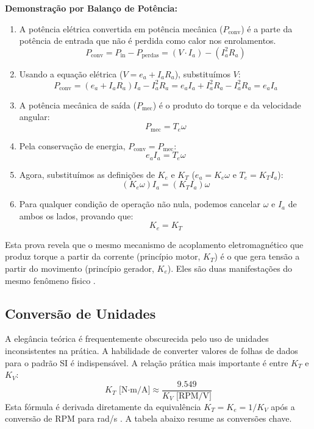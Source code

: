\documentclass[12pt, a4paper, openright, oneside, brazilian]{abntex2}
\begin{document}
\textbf{Demonstração por Balanço de Potência:}
\begin{enumerate}
    \item A potência elétrica convertida em potência mecânica ($P_{\text{conv}}$) é a parte da potência de entrada que não é perdida como calor nos enrolamentos.
    \[ P_{\text{conv}} = P_{\text{in}} - P_{\text{perdas}} = (V \cdot I_a) - (I_a^2 R_a) \]
    \item Usando a equação elétrica ($V = e_a + I_a R_a$), substituímos $V$:
    \[ P_{\text{conv}} = (e_a + I_a R_a)I_a - I_a^2 R_a = e_a I_a + I_a^2 R_a - I_a^2 R_a = e_a I_a \]
    \item A potência mecânica de saída ($P_{\text{mec}}$) é o produto do torque e da velocidade angular:
    \[ P_{\text{mec}} = T_e \omega \]
    \item Pela conservação de energia, $P_{\text{conv}} = P_{\text{mec}}$:
    \[ e_a I_a = T_e \omega \]
    \item Agora, substituímos as definições de $K_e$ e $K_T$ ($e_a = K_e \omega$ e $T_e = K_T I_a$):
    \[ (K_e \omega) I_a = (K_T I_a) \omega \]
    \item Para qualquer condição de operação não nula, podemos cancelar $\omega$ e $I_a$ de ambos os lados, provando que:
    \begin{equation}
        K_e = K_T
    \end{equation}
\end{enumerate}
Esta prova revela que o mesmo mecanismo de acoplamento eletromagnético que produz torque a partir da corrente (princípio motor, $K_T$) é o que gera tensão a partir do movimento (princípio gerador, $K_e$). Eles são duas manifestações do mesmo fenômeno físico \parencite{zoltan2012understanding, garcia1997modelagem}.

\subsection{Conversão de Unidades}

A elegância teórica é frequentemente obscurecida pelo uso de unidades inconsistentes na prática. A habilidade de converter valores de folhas de dados para o padrão SI é indispensável. A relação prática mais importante é entre $K_T$ e $K_V$:
\begin{equation}
    K_T \text{ [N·m/A]} \approx \frac{9.549}{K_V \text{ [RPM/V]}}
\end{equation}
Esta fórmula é derivada diretamente da equivalência $K_T = K_e = 1/K_V$ após a conversão de RPM para rad/s \parencite{infineon2011bldc}. A tabela abaixo resume as conversões chave.
\end{document}
